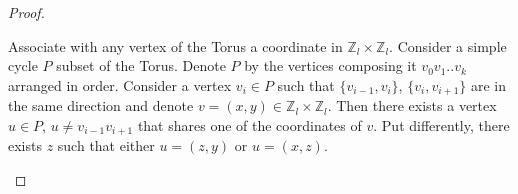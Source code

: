 \begin{proof}
  \begin{claim}
    \label{claim:inter}
Associate with any vertex of the Torus a coordinate in $\mathbb{Z}_{l} \times \mathbb{Z}_{l}$. Consider a simple cycle $P$ subset of the Torus. Denote $P$ by the vertices composing it $v_{0}v_{1}..v_{k}$ arranged in order. Consider a vertex $v_{i} \in P$ such that $\{v_{i-1}, v_{i}\}$, $\{v_{i}, v_{i+1}\}$ are in the same direction and denote $v = \left( x,y \right) \in $$ \mathbb{Z}_{l} \times \mathbb{Z}_{l}$. Then there exists a vertex $u \in P$, $ u \neq v_{i-1}v_{i+1}$ that shares one of the coordinates of $v$. Put differently, there exists $z$ such that either  $u = \left( z,y \right)$ or $u = \left( x,z \right)$.
  \end{claim}


\end{proof}
